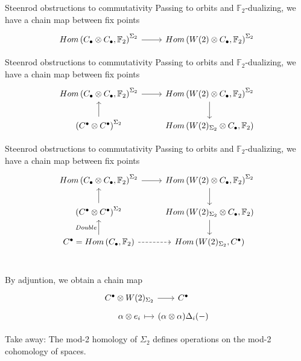 \documentclass[10pt,t]{beamer}
\newcommand{\F}{\mathbb F}
\begin{document}
\begin{frame}[fragile]{Steenrod obstructions to commutativity}
	Passing to orbits and $\F_2$-dualizing, we have a chain map between fix points
	\begin{equation*}
	\begin{tikzcd}
	Hom\left(C_\bullet \otimes C_\bullet, \F_2 \right)^{\Sigma_2} \arrow[r] &
	Hom\left(W(2) \otimes C_\bullet, \F_2 \right)^{\Sigma_2}
	\end{tikzcd}
	\end{equation*}
\end{frame}
\begin{frame}[fragile]{Steenrod obstructions to commutativity}
	Passing to orbits and $\F_2$-dualizing, we have a chain map between fix points
	\begin{equation*}
	\begin{tikzcd}
	Hom\left(C_\bullet \otimes C_\bullet, \F_2 \right)^{\Sigma_2} \arrow[r] &
	Hom\left(W(2) \otimes C_\bullet, \F_2 \right)^{\Sigma_2} \arrow[d] \\
	\left(C^\bullet \otimes C^\bullet\right)^{\Sigma_2} \arrow[u] &
	Hom\left(W(2)_{\Sigma_2} \otimes C_\bullet, \F_2 \right)
	\end{tikzcd}
	\end{equation*}
\end{frame}
\begin{frame}[fragile]{Steenrod obstructions to commutativity}
	Passing to orbits and $\F_2$-dualizing, we have a chain map between fix points
	\begin{equation*}
	\begin{tikzcd}
	Hom\left(C_\bullet \otimes C_\bullet, \F_2 \right)^{\Sigma_2} \arrow[r] &
	Hom\left(W(2) \otimes C_\bullet, \F_2 \right)^{\Sigma_2} \arrow[d] \\
	\left(C^\bullet \otimes C^\bullet\right)^{\Sigma_2} \arrow[u]&
	Hom\left(W(2)_{\Sigma_2} \otimes C_\bullet, \F_2 \right) \arrow[d] \\
	C^\bullet = Hom\left(C_\bullet, \F_2 \right) \arrow[u, "Double"] \arrow[r, dashed]&
	Hom\left(W(2)_{\Sigma_2}, C^\bullet\right) \\
	\end{tikzcd}
	\end{equation*}
	
	\vspace*{-22pt}\pause
	
	By adjuntion, we obtain a chain map
	\vspace*{-5pt}
	\begin{equation*}
	\begin{tikzcd}[row sep=tiny, column sep = tiny]
	C^\bullet \otimes W(2)_{\Sigma_2} \arrow[r] &[-10pt] C^\bullet \\
	\alpha \otimes e_i \arrow[r, |->] & (\alpha \otimes \alpha)\Delta_i(-)
	\end{tikzcd}
	\end{equation*}
	
	\vspace*{-5pt}\pause
	
	\textcolor{pblue}{Take away:} The mod-2 homology of $\Sigma_2$ defines operations on the mod-2 cohomology of spaces.
\end{frame}
\end{document}
